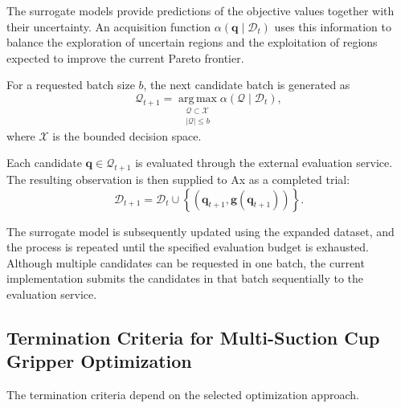The surrogate models provide predictions of the objective values together with their uncertainty. An
acquisition function $\alpha(\mathbf{q}\mid\mathcal{D}_t)$ uses this information to balance the
exploration of uncertain regions and the exploitation of regions expected to improve the current
Pareto frontier.

For a requested batch size $b$, the next candidate batch is generated as
\begin{equation}
    \mathcal{Q}_{t+1}
    =
    \operatorname*{arg\,max}_{
        \substack{
            \mathcal{Q}\subset\mathcal{X}\\
            |\mathcal{Q}|\leq b
        }
    }
    \alpha(\mathcal{Q}\mid\mathcal{D}_t),
\end{equation}
where $\mathcal{X}$ is the bounded decision space. 

Each candidate $\mathbf{q}\in\mathcal{Q}_{t+1}$ is evaluated through the external evaluation
service. The resulting observation is then supplied to Ax as a completed trial:
\begin{equation}
    \mathcal{D}_{t+1}
    =
    \mathcal{D}_t
    \cup
    \left\{
        \left(
            \mathbf{q}_{t+1},
            \mathbf{g}(\mathbf{q}_{t+1})
        \right)
    \right\}.
\end{equation}

The surrogate model is subsequently updated using the expanded dataset, and the process is repeated
until the specified evaluation budget is exhausted. Although multiple candidates can be requested in
one batch, the current implementation submits the candidates in that batch sequentially to the
evaluation service.

\subsection{Termination Criteria for Multi-Suction Cup Gripper Optimization}

The termination criteria depend on the selected optimization approach.

